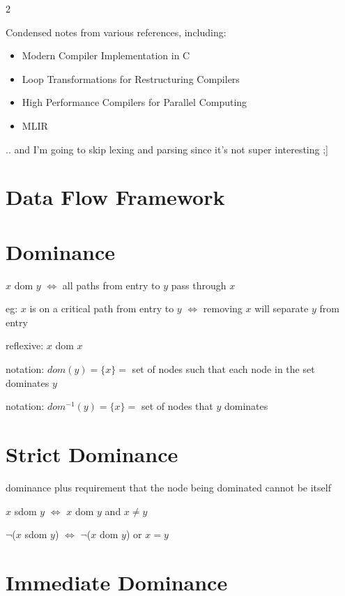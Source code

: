 \documentclass[8pt]{extarticle}
\begin{document}
  
\begin{multicols*}{2}

  Condensed notes from various references, including:
  \begin{itemize}
  \item Modern Compiler Implementation in C \cite{appelbook}
  \item Loop Transformations for Restructuring Compilers \cite{banerjee1993}
  \item High Performance Compilers for Parallel Computing \cite{wolfebook}
  \item MLIR \cite{mlir2021}
  \end{itemize}

  .. and I'm going to skip lexing and parsing since it's not super interesting ;]

  \vfill\null
  \columnbreak
    
  \section{Data Flow Framework}

  \section{Dominance}
  $x$ dom $y$ $\iff$ all paths from entry to $y$ pass through $x$

  eg: $x$ is on a critical path from entry to $y$ $\iff$ removing $x$ will separate $y$ from entry
  
  reflexive: $x$ dom $x$

  notation: $dom(y) = \{ x \} =$ set of nodes such that each node in the set dominates $y$

  notation: $dom^{-1}(y) = \{ x \} =$ set of nodes that $y$ dominates

  \section{Strict Dominance}

  dominance plus requirement that the node being dominated cannot be itself

  $x$ sdom $y$ $\iff$ $x$ dom $y$ and $x \neq y$

  $\neg$($x$ sdom $y$) $\iff$ $\neg$($x$ dom $y$) or $x = y$
  
  \section{Immediate Dominance}


\end{multicols*}
\end{document}
